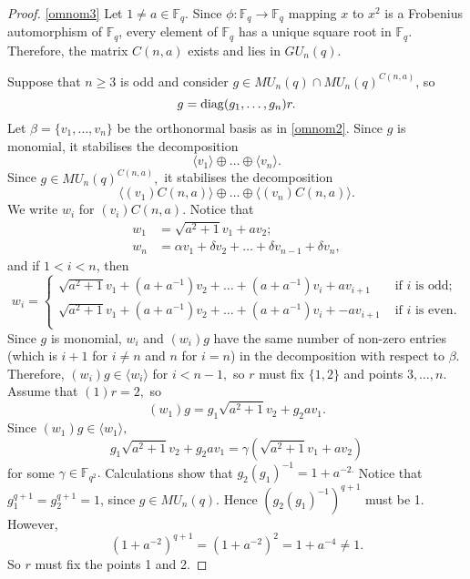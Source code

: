 \begin{proof}
 

\eqref{omnom3} Let $1 \ne a \in \mathbb{F}_q$. Since $\phi : \mathbb{F}_q \to \mathbb{F}_q$ mapping $x$ to $x^2$ is a Frobenius automorphism of $\mathbb{F}_q$, every element of $\mathbb{F}_q$ has a unique square root in $\mathbb{F}_q$. Therefore, the matrix $C(n,a)$ exists and lies in $GU_n(q).$ 

Suppose that $n\ge 3$ is odd and consider $g \in MU_n(q) \cap MU_n(q)^{C(n,a)}$, so 
\begin{equation*}
g=\mathrm{diag}(g_1, \ldots, g_n)r.
\end{equation*}
Let $\beta=\{v_1, \ldots, v_n\}$ be the orthonormal basis as in \eqref{omnom2}. Since $g$ is monomial, it stabilises the decomposition
$$\langle v_1\rangle \oplus \ldots \oplus \langle v_n \rangle.$$ Since $g \in MU_n(q)^{C(n,a)},$ it stabilises the decomposition 
$$\langle (v_1)C(n,a)\rangle \oplus \ldots \oplus \langle (v_n) C(n,a) \rangle.$$ We write $w_i$ for $(v_i)C(n,a).$ Notice that 
\begin{equation*}
\begin{aligned}
w_1 & =\sqrt{a^2+1} v_1 +a v_2;\\
w_n & =\alpha v_1 + \delta v_2+    \ldots  + \delta v_{n-1} + \delta v_{n},
\end{aligned}
\end{equation*}
and if $1<i<n$, then 
\begin{equation*}
w_i=
\begin{cases}
\sqrt{a^2+1} v_1 + (a+a^{-1})v_2 +   \ldots+   (a+a^{-1})v_i + av_{i+1} & \text{ if $i$ is odd;}  \\ 
\sqrt{a^2+1} v_1 + (a+a^{-1})v_2+    \ldots +  (a+a^{-1})v_i + -av_{i+1} & \text{ if $i$ is even.} \\
       
\end{cases}
\end{equation*}
Since $g$ is monomial, $w_i$ and $(w_i)g$ have the same number of non-zero entries (which is $i+1$ for $i \ne n$ and $n$ for $i=n$) in the decomposition with respect to $\beta.$ Therefore, $(w_i)g \in \langle w_i \rangle$ for $i <n-1,$ so $r$ must fix $\{1,2\}$ and points $3, \ldots, n.$
Assume that $(1)r=2,$ so $$(w_1)g= g_1 \sqrt{a^2+1}v_2 + g_2av_1.$$ Since $(w_1)g \in \langle w_1 \rangle,$  
$$g_1 \sqrt{a^2+1}v_2 + g_2av_1= \gamma (\sqrt{a^2+1} v_1 +a v_2)$$
for some $\gamma \in \mathbb{F}_{q^2}.$ Calculations show that $g_2(g_1)^{-1}=1+a^{-2.}$ Notice that $g_1^{q+1}=g_2^{q+1}=1$, since $g \in MU_n(q).$ Hence $(g_2(g_1)^{-1})^{q+1}$ must be 1. However,
$$(1+a^{-2})^{q+1}=(1+a^{-2})^2=1+a^{-4} \ne 1.$$
So $r$ must fix the points 1 and 2. 


\end{proof}

